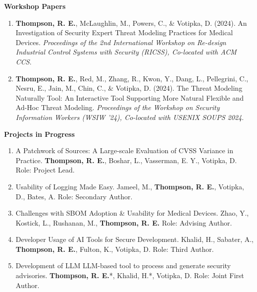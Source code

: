 \documentclass[10pt,letterpaper]{article}
\makeatletter
\newcommand{\reversearabic}[1]{\expandafter\@reversearabic\csname c@#1\endcsname}
\newcommand{\@reversearabic}[1]{%
  \number\numexpr\getrefnumber{this@etaremune@\romannumeral\c@etaremune}-#1+1\relax
}
\newcounter{etaremune}
\newenvironment{etaremune}[1][]{%
  \stepcounter{etaremune}%
  \begin{enumerate}[label=\reversearabic*.,#1]%
}{%
  \edef\@currentlabel{\the\csname c@\@enumctr\endcsname}%
  \label{this@etaremune@\romannumeral\c@etaremune}%
  \end{enumerate}%
}
\makeatother
\begin{document}
\textbf{Workshop Papers}
\begin{etaremune}[label={W.\reversearabic*}]
     \item \textbf{Thompson, R. E.}, McLaughlin, M., Powers, C., \& Votipka, D. (2024). An Investigation of Security Expert Threat Modeling Practices for Medical Devices. \textit{Proceedings of the 2nd International Workshop on Re-design Industrial Control Systems with Security (RICSS), Co-located with ACM CCS}.
     \item \textbf{Thompson, R. E.}, Red, M., Zhang, R., Kwon, Y., Dang, L., Pellegrini, C., Nesru, E., Jain, M., Chin, C., \& Votipka, D. (2024). The Threat Modeling Naturally Tool: An Interactive Tool Supporting More Natural Flexible and Ad-Hoc Threat Modeling. \textit{Proceedings of the Workshop on Security Information Workers (WSIW '24), Co-located with USENIX SOUPS 2024}.
\end{etaremune}

    

\textbf{Projects in Progress}
\begin{etaremune}[label={I.\reversearabic*}]
    \item A Patchwork of Sources: A Large-scale Evaluation of CVSS Variance in Practice. \textbf{Thompson, R. E.}, Boshar, L., Vasserman, E. Y., Votipka, D. Role: Project Lead.
    \item Usability of Logging Made Easy. Jameel, M., \textbf{Thompson, R. E.}, Votipka, D., Bates, A. Role: Secondary Author.
    \item Challenges with SBOM Adoption \& Usability for Medical Devices. Zhao, Y., Kostick, L., Rushanan, M., \textbf{Thompson, R. E.} Role: Advising Author.
    \item Developer Usage of AI Tools for Secure Development. Khalid, H., Sabater, A., \textbf{Thompson, R. E.}, Fulton, K., Votipka, D. Role: Third Author.
    \item Development of LLM LLM-based tool to process and generate security advisories. \textbf{Thompson, R. E.}*, Khalid, H.*, Votipka, D. Role: Joint First Author.
\end{etaremune}
\end{document}
